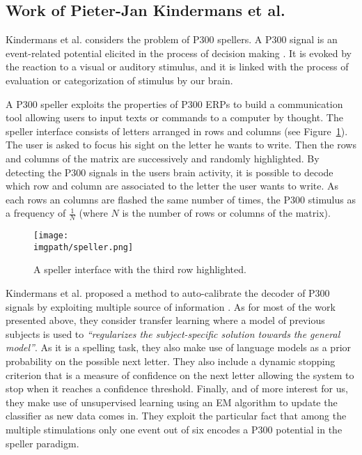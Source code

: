 \subsection{Work of Pieter-Jan Kindermans et al.}
\label{chapter:related:bci:kindermans}

Kindermans et al. considers the problem of P300 spellers. A P300 signal is an event-related potential elicited in the process of decision making \cite{polich2003theoretical}. It is evoked by the reaction to a visual or auditory stimulus, and it is linked with the process of evaluation or categorization of stimulus by our brain. 

A P300 speller exploits the properties of P300 ERPs to build a communication tool allowing users to input texts or commands to a computer by thought. The speller interface consists of letters arranged in rows and columns (see Figure~\ref{fig:speller}). The user is asked to focus his sight on the letter he wants to write. Then the rows and columns of the matrix are successively and randomly highlighted. By detecting the P300 signals in the users brain activity, it is possible to decode which row and column are associated to the letter the user wants to write. As each rows an columns are flashed the same number of times, the P300 stimulus as a frequency of $\frac{1}{N}$ (where $N$ is the number of rows or columns of the matrix).

\begin{figure}[!htbp]
  \centering
  \texttt{[image: \\imgpath/speller.png]}
  \caption{A speller interface with the third row highlighted.}
  \label{fig:speller}
\end{figure}

Kindermans et al. proposed a method to auto-calibrate the decoder of P300 signals by exploiting multiple source of information \cite{kindermans2012b,kindermans2014integrating}. As for most of the work presented above, they consider transfer learning where a model of previous subjects is used to \textit{``regularizes the subject-specific solution towards the general model''}. As it is a spelling task, they also make use of language models as a prior probability on the possible next letter. They also include a dynamic stopping criterion that is a measure of confidence on the next letter allowing the system to stop when it reaches a confidence threshold. Finally, and of more interest for us, they make use of unsupervised learning using an EM algorithm to update the classifier as new data comes in. They exploit the particular fact that among the multiple stimulations only one event out of six encodes a P300 potential in the speller paradigm.

